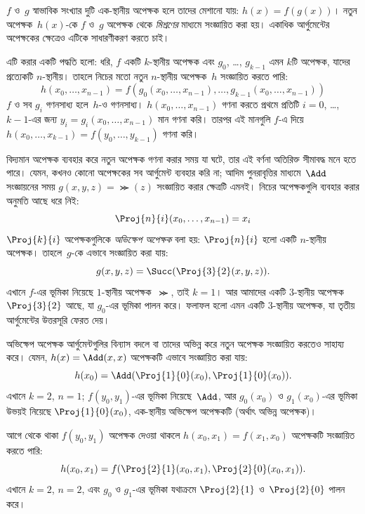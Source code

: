 \documentclass[../../../include/open-logic-section]{subfiles}
\begin{document}

$f$ ও~$g$ স্বাভাবিক সংখ্যার দুটি এক-স্থানীয় অপেক্ষক হলে তাদের মেশানো
যায়: $h(x) = f(g(x))$। নতুন অপেক্ষক~$h(x)$-কে $f$ ও~$g$ অপেক্ষক
থেকে \emph{মিশ্রণের} মাধ্যমে সংজ্ঞায়িত করা হয়। একাধিক আর্গুমেন্টের
অপেক্ষকের ক্ষেত্রেও এটিকে সাধারণীকরণ করতে চাই।

এটি করার একটি পদ্ধতি হলো: ধরি, $f$ একটি $k$-স্থানীয় অপেক্ষক এবং
$g_0$, \dots, $g_{k-1}$ এমন $k$টি অপেক্ষক, যাদের প্রত্যেকটি
$n$-স্থানীয়। তাহলে নিচের মতো নতুন $n$-স্থানীয় অপেক্ষক~$h$
সংজ্ঞায়িত করতে পারি:
\[
h(x_0, \dots, x_{n-1}) =
f(g_0(x_0, \dots, x_{n-1}), \dots, g_{k-1}(x_0, \dots, x_{n-1}))
\]
$f$ ও সব $g_i$ গণনসাধ্য হলে~$h$-ও গণনসাধ্য। $h(x_0,
\dots, x_{n-1})$ গণনা করতে প্রথমে প্রতিটি $i=0$, \dots,~$k-1$-এর জন্য
$y_i = g_i(x_0, \dots, x_{n-1})$ মান গণনা করি। তারপর এই মানগুলি $f$-এ
দিয়ে $h(x_0, \dots, x_{k-1}) = f(y_0, \dots, y_{k-1})$ গণনা করি।

বিদ্যমান অপেক্ষক ব্যবহার করে নতুন অপেক্ষক গণনা করার সময় যা ঘটে, তার
এই বর্ণনা অতিরিক্ত সীমাবদ্ধ মনে হতে পারে। যেমন, কখনও কোনো অপেক্ষকের
সব আর্গুমেন্ট ব্যবহার করি না; আদিম পুনরাবৃত্তির মাধ্যমে~$\Add$
সংজ্ঞায়নের সময় $g(x, y, z) = \Succ(z)$ সংজ্ঞায়িত করার ক্ষেত্রটি
এমনই। নিচের অপেক্ষকগুলি ব্যবহার করার অনুমতি আছে ধরে নিই:
\[
\Proj{n}{i}(x_0, \dots, x_{n-1}) = x_i
\]
$\Proj{k}{i}$ অপেক্ষকগুলিকে \emph{অভিক্ষেপ অপেক্ষক} বলা হয়:
$\Proj{n}{i}$ হলো একটি $n$-স্থানীয় অপেক্ষক। তাহলে~$g$-কে এভাবে
সংজ্ঞায়িত করা যায়:
\[
g(x, y, z) = \Succ(\Proj{3}{2}(x, y, z)).
\]
এখানে $f$-এর ভূমিকা নিয়েছে $1$-স্থানীয় অপেক্ষক~$\Succ$, তাই $k=1$।
আর আমাদের একটি $3$-স্থানীয় অপেক্ষক~$\Proj{3}{2}$ আছে, যা $g_0$-এর
ভূমিকা পালন করে। ফলাফল হলো এমন একটি $3$-স্থানীয় অপেক্ষক, যা তৃতীয়
আর্গুমেন্টের উত্তরসূরি ফেরত দেয়।

অভিক্ষেপ অপেক্ষক আর্গুমেন্টগুলির বিন্যাস বদলে বা তাদের অভিন্ন করে নতুন
অপেক্ষক সংজ্ঞায়িত করতেও সাহায্য করে। যেমন, $h(x) = \Add(x, x)$ অপেক্ষকটি
এভাবে সংজ্ঞায়িত করা যায়:
\[
h(x_0) = \Add(\Proj{1}{0}(x_0),\Proj{1}{0}(x_0)).
\]
এখানে $k=2$, $n=1$; $f(y_0,y_1)$-এর ভূমিকা নিয়েছে~$\Add$, আর
$g_0(x_0)$ ও $g_1(x_0)$-এর ভূমিকা উভয়ই নিয়েছে
$\Proj{1}{0}(x_0)$, এক-স্থানীয় অভিক্ষেপ অপেক্ষকটি (অর্থাৎ অভিন্ন অপেক্ষক)।

আগে থেকে থাকা $f(y_0, y_1)$ অপেক্ষক দেওয়া থাকলে
$h(x_0, x_1) = f(x_1, x_0)$ অপেক্ষকটি সংজ্ঞায়িত করতে পারি:
\[
h(x_0, x_1) = f(\Proj{2}{1}(x_0, x_1),\Proj{2}{0}(x_0, x_1)).
\]
এখানে $k=2$, $n = 2$, এবং $g_0$ ও $g_1$-এর ভূমিকা যথাক্রমে
$\Proj{2}{1}$ ও~$\Proj{2}{0}$ পালন করে।
\end{document}
